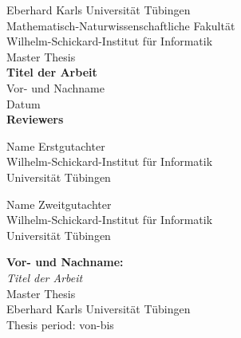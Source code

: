 \documentclass[a4paper,UKenglish,compactauthor]{lipics-v2021}
\title{\thesisTitle}
\newcommand{\authorName}{Vor- und Nachname}
\newcommand{\thesisTitle}{Titel der Arbeit}
\newcommand{\thesisDate}{Datum}
\begin{document}

\begin{titlepage}
 \begin{center}
  {\LARGE Eberhard Karls Universität Tübingen}\\
  {\large Mathematisch-Naturwissenschaftliche Fakultät \\
Wilhelm-Schickard-Institut für Informatik\\[4cm]}
  {\huge Master Thesis\\[2cm]}
  {\Large\bf  \thesisTitle\\[1.5cm]}
 {\large \authorName}\\[0.5cm]
\thesisDate\\[4cm]
{\small\bf Reviewers}\\[0.5cm]
  \parbox{7cm}%
  {\begin{center}{\large Name Erstgutachter}\\
    {\footnotesize Wilhelm-Schickard-Institut für Informatik\\
	  Universität Tübingen\vspace{0.4cm}}\end{center}}\hfill\parbox{7cm}%
  {\begin{center}
    {\large Name Zweitgutachter}\\
    {\footnotesize Wilhelm-Schickard-Institut für Informatik\\
	  Universität Tübingen}\end{center}
  }
  \end{center}
\end{titlepage}


\thispagestyle{empty}
\vspace*{\fill}
\begin{minipage}{11.2cm}
\textbf{\authorName:}\\
\emph{\thesisTitle}\\ Master Thesis\\
Eberhard Karls Universität Tübingen\\
Thesis period: von-bis
\end{minipage}
\newpage

\end{document}
